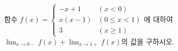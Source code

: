 함수 $f(x)=\begin{cases} -x+1 & (x<0) \\ x(x-1) & (0\le x<1) \\ 3 & (x\ge 1) \end{cases}$에 대하여 $\displaystyle\lim_{x\to 0-}f(x)+\lim_{x\to 1+}f(x)$의 값을 구하시오.
